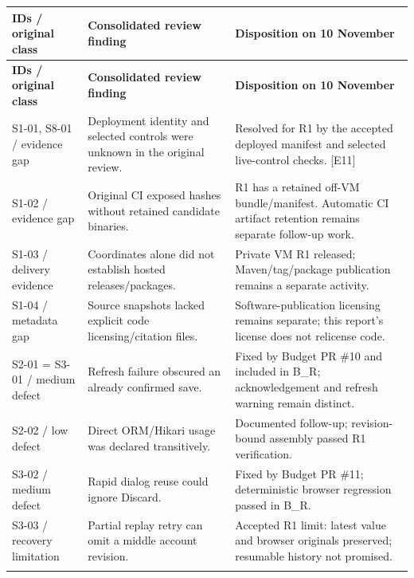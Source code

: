 \documentclass[11pt,a4paper]{article}
\begin{document}
{\fontsize{9.5}{11.5}\selectfont
\begin{longtable}{@{}>{\raggedright\arraybackslash}p{}>{\raggedright\arraybackslash}p{}>{\raggedright\arraybackslash}p{}@{}}\toprule
\textbf{IDs /\allowbreak{} original class} & \textbf{Consolidated review finding} & \textbf{Disposition on 10 November} \\ \midrule\endfirsthead
\toprule\textbf{IDs /\allowbreak{} original class} & \textbf{Consolidated review finding} & \textbf{Disposition on 10 November} \\ \midrule\endhead
\bottomrule\endfoot
S1-01, S8-01 /\allowbreak{} evidence gap & Deployment identity and selected controls were unknown in the original review. & Resolved for R1 by the accepted deployed manifest and selected live-control checks. [E11] \\ \addlinespace[3pt]
S1-02 /\allowbreak{} evidence gap & Original CI exposed hashes without retained candidate binaries. & R1 has a retained off-VM bundle/\allowbreak{}manifest. Automatic CI artifact retention remains separate follow-up work. \\ \addlinespace[3pt]
S1-03 /\allowbreak{} delivery evidence & Coordinates alone did not establish hosted releases/\allowbreak{}packages. & Private VM R1 released; Maven/\allowbreak{}tag/\allowbreak{}package publication remains a separate activity. \\ \addlinespace[3pt]
S1-04 /\allowbreak{} metadata gap & Source snapshots lacked explicit code licensing/\allowbreak{}citation files. & Software-publication licensing remains separate; this report's license does not relicense code. \\ \addlinespace[3pt]
S2-01 = S3-01 /\allowbreak{} medium defect & Refresh failure obscured an already confirmed save. & Fixed by Budget PR \#10 and included in B\_R; acknowledgement and refresh warning remain distinct. \\ \addlinespace[3pt]
S2-02 /\allowbreak{} low defect & Direct ORM/\allowbreak{}Hikari usage was declared transitively. & Documented follow-up; revision-bound assembly passed R1 verification. \\ \addlinespace[3pt]
S3-02 /\allowbreak{} medium defect & Rapid dialog reuse could ignore Discard. & Fixed by Budget PR \#11; deterministic browser regression passed in B\_R. \\ \addlinespace[3pt]
S3-03 /\allowbreak{} recovery limitation & Partial replay retry can omit a middle account revision. & Accepted R1 limit: latest value and browser originals preserved; resumable history not promised. \\ \addlinespace[3pt]

\end{longtable}}
\end{document}
